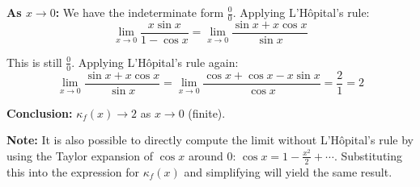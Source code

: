 \documentclass[reqno]{exam}
\begin{document}
\begin{questions}
\begin{solution}
    \textbf{As $x \to 0$:} We have the indeterminate form $\frac{0}{0}$. Applying L'Hôpital's rule:
    $$\lim_{x \to 0} \frac{x \sin x}{1 - \cos x} = \lim_{x \to 0} \frac{\sin x + x \cos x}{\sin x}$$

    This is still $\frac{0}{0}$. Applying L'Hôpital's rule again:
    $$\lim_{x \to 0} \frac{\sin x + x \cos x}{\sin x} = \lim_{x \to 0} \frac{\cos x + \cos x - x \sin x}{\cos x} = \frac{2}{1} = 2$$

    \textbf{Conclusion:} $\kappa_f(x) \to 2$ as $x \to 0$ (finite).
    
    \textbf{Note:} It is also possible to directly compute the limit without L'Hôpital's rule by using the Taylor expansion of $\cos x$ around $0$: $\cos x = 1 - \frac{x^2}{2} + \cdots$. Substituting this into the expression for $\kappa_f(x)$ and simplifying will yield the same result.
  \end{solution}

\end{questions}
\end{document}
